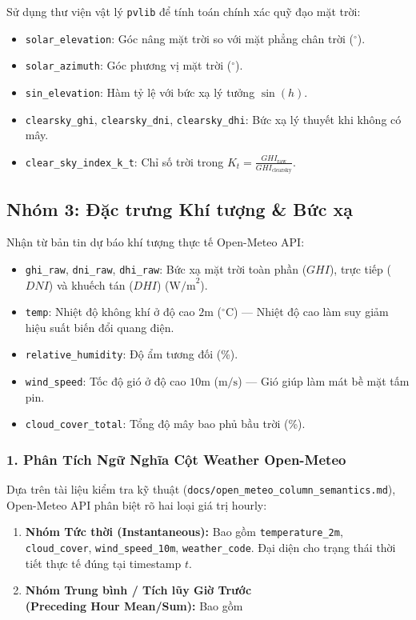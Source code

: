 \documentclass[12pt,a4paper]{article}
\begin{document}
Sử dụng thư viện vật lý \texttt{pvlib} để tính toán chính xác quỹ đạo mặt trời:
\begin{itemize}
    \item \texttt{solar\_elevation}: Góc nâng mặt trời so với mặt phẳng chân trời ($^\circ$).
    \item \texttt{solar\_azimuth}: Góc phương vị mặt trời ($^\circ$).
    \item \texttt{sin\_elevation}: Hàm tỷ lệ với bức xạ lý tưởng $\sin(h)$.
    \item \texttt{clearsky\_ghi}, \texttt{clearsky\_dni}, \texttt{clearsky\_dhi}: Bức xạ lý thuyết khi không có mây.
    \item \texttt{clear\_sky\_index\_k\_t}: Chỉ số trời trong $K_t = \frac{GHI_{\text{raw}}}{GHI_{\text{clearsky}}}$.
\end{itemize}

\subsection[Nhóm 3: Đặc trưng Khí tượng]{Nhóm 3: Đặc trưng Khí tượng \& Bức xạ}
Nhận từ bản tin dự báo khí tượng thực tế Open-Meteo API:
\begin{itemize}
    \item \texttt{ghi\_raw}, \texttt{dni\_raw}, \texttt{dhi\_raw}: Bức xạ mặt trời toàn phần ($GHI$), trực tiếp ($DNI$) và khuếch tán ($DHI$) ($\text{W/m}^2$).
    \item \texttt{temp}: Nhiệt độ không khí ở độ cao $2\text{m}$ ($^\circ\text{C}$) --- Nhiệt độ cao làm suy giảm hiệu suất biến đổi quang điện.
    \item \texttt{relative\_humidity}: Độ ẩm tương đối (\%).
    \item \texttt{wind\_speed}: Tốc độ gió ở độ cao $10\text{m}$ ($\text{m/s}$) --- Gió giúp làm mát bề mặt tấm pin.
    \item \texttt{cloud\_cover\_total}: Tổng độ mây bao phủ bầu trời (\%).
\end{itemize}

\subsubsection{1. Phân Tích Ngữ Nghĩa Cột Weather Open-Meteo}
Dựa trên tài liệu kiểm tra kỹ thuật (\texttt{docs/open\_meteo\_column\_semantics.md}), Open-Meteo API phân biệt rõ hai loại giá trị hourly:
\begin{enumerate}
    \item \textbf{Nhóm Tức thời (Instantaneous):} Bao gồm \texttt{temperature\_2m}, \texttt{cloud\_cover}, \texttt{wind\_speed\_10m}, \texttt{weather\_code}. Đại diện cho trạng thái thời tiết thực tế đúng tại timestamp $t$.
\item \textbf{Nhóm Trung bình / Tích lũy Giờ Trước}\\ \textbf{(Preceding Hour Mean/Sum):} Bao gồm
\end{enumerate}
\end{document}
